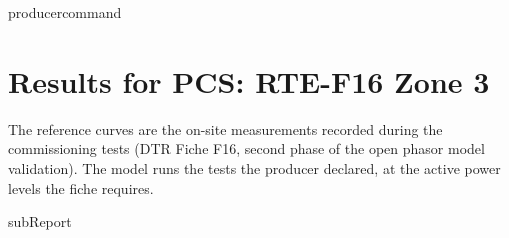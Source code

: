 {{ producercommand }}




    \section{Results for PCS: RTE-F16 Zone 3}

    The reference curves are the on-site measurements recorded during the commissioning
    tests (DTR Fiche F16, second phase of the open phasor model validation). The model
    runs the tests the producer declared, at the active power levels the fiche requires.

    {{subReport}}
    \newpage

